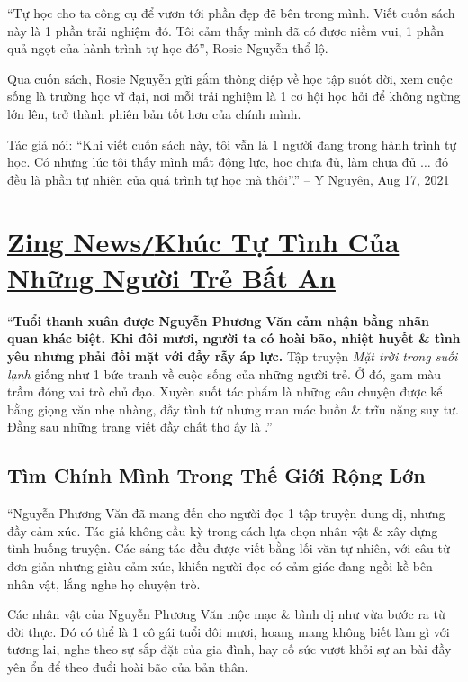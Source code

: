 \documentclass[oneside]{book}
\numberwithin{equation}{section}
\begin{document}
``Tự học cho ta công cụ để vươn tới phần đẹp đẽ bên trong mình. Viết cuốn sách này là 1 phần trải nghiệm đó. Tôi cảm thấy mình đã có được niềm vui, 1 phần quả ngọt của hành trình tự học đó'', Rosie Nguyễn thổ lộ.

Qua cuốn sách, Rosie Nguyễn gửi gắm thông điệp về học tập suốt đời, xem cuộc sống là trường học vĩ đại, nơi mỗi trải nghiệm là 1 cơ hội học hỏi để không ngừng lớn lên, trở thành phiên bản tốt hơn của chính mình.

Tác giả nói: ``Khi viết cuốn sách này, tôi vẫn là 1 người đang trong hành trình tự học. Có những lúc tôi thấy mình mất động lực, học chưa đủ, làm chưa đủ $\ldots$ đó đều là phần tự nhiên của quá trình tự học mà thôi''.'' -- Y Nguyên, Aug 17, 2021


\section{\href{https://zingnews.vn/khuc-tu-tinh-cua-nhung-nguoi-tre-bat-an-post1322529.html}{Zing News\texttt{/}Khúc Tự Tình Của Những Người Trẻ Bất An}}
``\textbf{Tuổi thanh xuân được Nguyễn Phương Văn cảm nhận bằng nhãn quan khác biệt. Khi đôi mươi, người ta có hoài bão, nhiệt huyết \& tình yêu nhưng phải đối mặt với đầy rẫy áp lực.} Tập truyện \textit{Mặt trời trong suối lạnh} giống như 1 bức tranh về cuộc sống của những người trẻ. Ở đó, gam màu trầm đóng vai trò chủ đạo. Xuyên suốt tác phẩm là những câu chuyện được kể bằng giọng văn nhẹ nhàng, đầy tình tứ nhưng man mác buồn \& trĩu nặng suy tư. Đằng sau những trang viết đầy chất thơ ấy là .''

\subsection{Tìm Chính Mình Trong Thế Giới Rộng Lớn}
``Nguyễn Phương Văn đã mang đến cho người đọc 1 tập truyện dung dị, nhưng đầy cảm xúc. Tác giả không cầu kỳ trong cách lựa chọn nhân vật \& xây dựng tình huống truyện. Các sáng tác đều được viết bằng lối văn tự nhiên, với câu từ đơn giản nhưng giàu cảm xúc, khiến người đọc có cảm giác đang ngồi kề bên nhân vật, lắng nghe họ chuyện trò.

Các nhân vật của Nguyễn Phương Văn mộc mạc \& bình dị như vừa bước ra từ đời thực. Đó có thể là 1 cô gái tuổi đôi mươi, hoang mang không biết làm gì với tương lai, nghe theo sự sắp đặt của gia đình, hay cố sức vượt khỏi sự an bài đầy yên ổn để theo đuổi hoài bão của bản thân.
\end{document}
